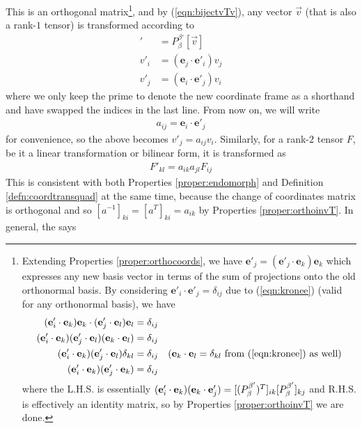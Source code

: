 This is an orthogonal matrix\footnote{\label{foot:orthodelta} Extending Properties \ref{proper:orthocoords}, we have $\textbf{e}'_{j} = (\textbf{e}'_{j} \cdot \textbf{e}_{k})\textbf{e}_{k}$ which expresses any new basis vector in terms of the sum of projections onto the old orthonormal basis. By considering $\textbf{e}'_{i} \cdot \textbf{e}'_{j} = \delta_{ij}$ due to (\ref{eqn:kronee}) (valid for any orthonormal basis), we have
\begin{align*}
(\textbf{e}'_{i} \cdot \textbf{e}_{k})\textbf{e}_{k} \cdot (\textbf{e}'_{j} \cdot \textbf{e}_{l})\textbf{e}_{l} &= \delta_{ij} \\
(\textbf{e}'_{i} \cdot \textbf{e}_{k})(\textbf{e}'_{j} \cdot \textbf{e}_{l})(\textbf{e}_{k} \cdot \textbf{e}_{l}) &= \delta_{ij} \\
(\textbf{e}'_{i} \cdot \textbf{e}_{k})(\textbf{e}'_{j} \cdot \textbf{e}_{l})\delta_{kl} &= \delta_{ij} & \text{($\textbf{e}_{k} \cdot \textbf{e}_{l} = \delta_{kl}$ from (\ref{eqn:kronee}) as well)} \\
(\textbf{e}'_{i} \cdot \textbf{e}_{k})(\textbf{e}'_{j} \cdot \textbf{e}_{k}) &= \delta_{ij}
\end{align*} where the L.H.S. is essentially $(\textbf{e}'_{i} \cdot \textbf{e}_{k})(\textbf{e}_{k} \cdot \textbf{e}'_{j}) = [\smash{(P_\beta^{\beta'})^T}]_{ik}[\smash{P_\beta^{\beta'}}]_{kj}$ and R.H.S. is effectively an identity matrix, so by Properties \ref{proper:orthoinvT} we are done.}, and by (\ref{eqn:bijectvTv}), any vector $\vec{v}$ (that is also a rank-$1$ tensor) is transformed according to
\begin{align}
[\vec{v}]' &= P_\beta^{\beta'}[\vec{v}] \nonumber \\
v'_i &= (\textbf{e}_j \cdot \textbf{e}'_i) v_j \nonumber \\
v'_j &= (\textbf{e}_i \cdot \textbf{e}'_j) v_i 
\end{align}
where we only keep the prime to denote the new coordinate frame as a shorthand and have swapped the indices in the last line. From now on, we will write 
\begin{align}
a_{ij} = \textbf{e}_i \cdot \textbf{e}'_j \label{eqn:aij}
\end{align} for convenience, so the above becomes $v'_j = a_{ij}v_i$. Similarly, for a rank-$2$ tensor $F$, be it a linear transformation or bilinear form, it is transformed as
\begin{align}
F'_{kl} = a_{ik} a_{jl} F_{ij} \label{eqn:rank2aF}
\end{align}
This is consistent with both Properties \ref{proper:endomorph} and Definition \ref{defn:coordtransquad} at the same time, because the change of coordinates matrix is orthogonal and so $[a^{-1}]_{ki} = [a^T]_{ki} = a_{ik}$ by Properties \ref{proper:orthoinvT}. In general, the  says

